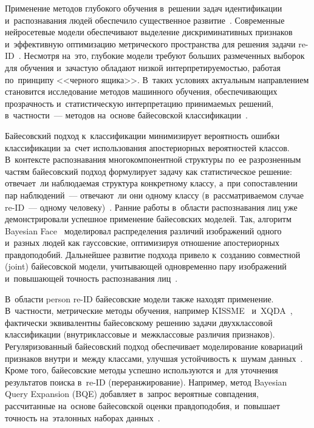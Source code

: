 Применение методов глубокого обучения в~решении задач
идентификации и~распознавания людей обеспечило существенное
развитие~\cite{Cho2024reid,Luo2019bagoftricks}. Современные
нейросетевые модели обеспечивают выделение дискриминативных признаков
и~эффективную оптимизацию метрического пространства для решения
задачи re-ID~\cite{Yadav2023reidsurvey}. Несмотря на~это, глубокие
модели требуют больших размеченных выборок для обучения и~зачастую
обладают низкой интерпретируемостью, работая по~принципу
<<черного ящика>>. В~таких условиях актуальным направлением становится
исследование методов машинного обучения, обеспечивающих прозрачность
и~статистическую интерпретацию принимаемых решений, в~частности~---
методов на~основе байесовской
классификации~\cite{Krivenko2020bayes,Saburov2024bayes}.

Байесовский подход к~классификации минимизирует вероятность ошибки
классификации за~счет использования апостериорных вероятностей
классов. В~контексте распознавания многокомпонентной структуры по~ее
разрозненным частям байесовский подход формулирует задачу как
статистическое решение: отвечает~ли наблюдаемая структура конкретному
классу, а~при сопоставлении пар наблюдений~--- отвечают~ли они одному
классу (в~рассматриваемом случае re-ID~--- одному
человеку)~\cite{Moghaddam2000bayesface,Chen2012bayesface}.
Ранние работы в~области распознавания лиц уже демонстрировали успешное
применение байесовских моделей. Так, алгоритм Bayesian
Face~\cite{Moghaddam2000bayesface} моделировал распределения различий
изображений одного и~разных людей как гауссовские, оптимизируя
отношение апостериорных правдоподобий. Дальнейшее развитие подхода
привело к~созданию совместной (joint) байесовской модели,
учитывающей одновременно пару изображений и~повышающей точность
распознавания лиц~\cite{Chen2012bayesface}.

В~области person re-ID байесовские модели также находят применение.
В~частности, метрические методы обучения, например
KISSME~\cite{Kostinger2012kissme} и~XQDA~\cite{Liao2015lomo},
фактически эквивалентны байесовскому решению задачи двухклассовой
классификации (внутриклассовые и~межклассовые различия признаков).
Регуляризованный байесовский подход обеспечивает моделирование
ковариаций признаков внутри и~между классами, улучшая устойчивость
к~шумам данных~\cite{Liao2015lomo}. Кроме того, байесовские методы
успешно используются и~для уточнения результатов поиска в~re-ID
(переранжирование). Например, метод Bayesian Query Expansion (BQE)
добавляет в~запрос вероятные совпадения, рассчитанные на~основе
байесовской оценки правдоподобия, и~повышает точность
на~эталонных наборах данных~\cite{Zhao2017spindle}.

